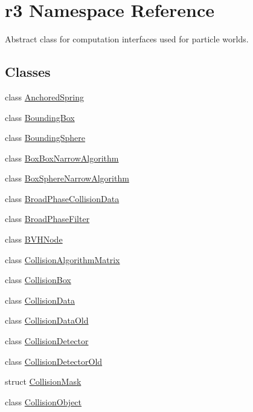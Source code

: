 \hypertarget{namespacer3}{}\section{r3 Namespace Reference}
\label{namespacer3}


Abstract class for computation interfaces used for particle worlds.  


\subsection*{Classes}
\begin{DoxyCompactItemize}
\item 
class \mbox{\hyperlink{classr3_1_1_anchored_spring}{Anchored\+Spring}}
\item 
class \mbox{\hyperlink{classr3_1_1_bounding_box}{Bounding\+Box}}
\item 
class \mbox{\hyperlink{classr3_1_1_bounding_sphere}{Bounding\+Sphere}}
\item 
class \mbox{\hyperlink{classr3_1_1_box_box_narrow_algorithm}{Box\+Box\+Narrow\+Algorithm}}
\item 
class \mbox{\hyperlink{classr3_1_1_box_sphere_narrow_algorithm}{Box\+Sphere\+Narrow\+Algorithm}}
\item 
class \mbox{\hyperlink{classr3_1_1_broad_phase_collision_data}{Broad\+Phase\+Collision\+Data}}
\item 
class \mbox{\hyperlink{classr3_1_1_broad_phase_filter}{Broad\+Phase\+Filter}}
\item 
class \mbox{\hyperlink{classr3_1_1_b_v_h_node}{B\+V\+H\+Node}}
\item 
class \mbox{\hyperlink{classr3_1_1_collision_algorithm_matrix}{Collision\+Algorithm\+Matrix}}
\item 
class \mbox{\hyperlink{classr3_1_1_collision_box}{Collision\+Box}}
\item 
class \mbox{\hyperlink{classr3_1_1_collision_data}{Collision\+Data}}
\item 
class \mbox{\hyperlink{classr3_1_1_collision_data_old}{Collision\+Data\+Old}}
\item 
class \mbox{\hyperlink{classr3_1_1_collision_detector}{Collision\+Detector}}
\item 
class \mbox{\hyperlink{classr3_1_1_collision_detector_old}{Collision\+Detector\+Old}}
\item 
struct \mbox{\hyperlink{structr3_1_1_collision_mask}{Collision\+Mask}}
\item 
class \mbox{\hyperlink{classr3_1_1_collision_object}{Collision\+Object}}

\end{DoxyCompactItemize}
